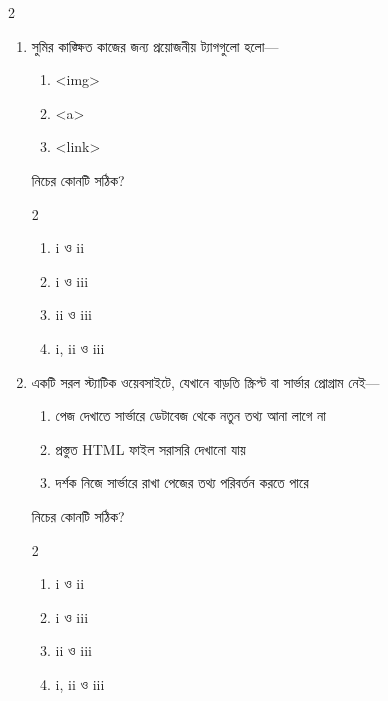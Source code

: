 \begin{multicols}{2}
\begin{enumerate}[resume=chFourFinalQuestions]
\item \begin{minipage}[t]{\linewidth}
সুমির কাঙ্ক্ষিত কাজের জন্য প্রয়োজনীয় ট্যাগগুলো হলো—
\begin{enumerate}[label=\Roman*.]
\item <img>
\item <a>
\item <link>
\end{enumerate}

নিচের কোনটি সঠিক?
\begin{multicols}{2}
\begin{enumerate}[label=\alph*)]
\item i ও ii 
\item i ও iii
\item ii ও iii
\item i, ii ও iii
\end{enumerate}
\end{multicols}


\end{minipage}

\item \begin{minipage}[t]{\linewidth}
একটি সরল স্ট্যাটিক ওয়েবসাইটে, যেখানে বাড়তি স্ক্রিপ্ট বা সার্ভার প্রোগ্রাম নেই—
\begin{enumerate}[label=\Roman*.]
\item পেজ দেখাতে সার্ভারে ডেটাবেজ থেকে নতুন তথ্য আনা লাগে না
\item প্রস্তুত HTML ফাইল সরাসরি দেখানো যায়
\item দর্শক নিজে সার্ভারে রাখা পেজের তথ্য পরিবর্তন করতে পারে
\end{enumerate}

নিচের কোনটি সঠিক?
\begin{multicols}{2}
\begin{enumerate}[label=\alph*)]
\item i ও ii 
\item i ও iii
\item ii ও iii
\item i, ii ও iii
\end{enumerate}
\end{multicols}


\end{minipage}

\end{enumerate}
\end{multicols}
